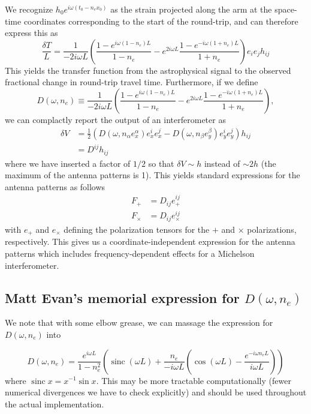 \documentclass{article}
\DeclareMathOperator{\sinc}{sinc}
\begin{document}
We recognize $h_0 e^{i\omega(t_0-n_ex_0)}$ as the strain projected along the arm at the space-time coordinates corresponding to the start of the round-trip, and can therefore express this as
\begin{equation}
    \frac{\delta T}{L} = \frac{1}{-2i\omega L} \left(\frac{1-e^{i\omega(1-n_e)L}}{1-n_e} - e^{2i\omega L}\frac{1-e^{-i\omega(1+n_e)L}}{1+n_e} \right) e_i e_j h_{ij}
\end{equation}
This yields the transfer function from the astrophysical signal to the observed fractional change in round-trip travel time. 
Furthermore, if we define
\begin{equation}
    D(\omega, n_e) \equiv \frac{1}{-2i\omega L} \left(\frac{1-e^{i\omega(1-n_e)L}}{1-n_e} - e^{2i\omega L}\frac{1-e^{-i\omega(1+n_e)L}}{1+n_e} \right),
\end{equation}
we can complactly report the output of an interferometer as
\begin{align}
    \delta V & = \frac{1}{2}\left( D(\omega, n_\alpha e_x^\alpha) e_x^i e_x^j - D(\omega, n_\beta e_y^\beta) e_y^i e_y^j \right) h_{ij} \\
             & = D^{ij} h_{ij}
\end{align}
where we have inserted a factor of $1/2$ so that $\delta V\sim h$ instead of $\sim 2h$ (the maximum of the antenna patterns is 1).
This yields standard expressions for the antenna patterns as follows
\begin{align}
    F_+ & = D_{ij} e_+^{ij} \\
    F_\times & = D_{ij} e_\times^{ij}
\end{align}
with $e_+$ and $e_\times$ defining the polarization tensors for the $+$ and $\times$ polarizations, respectively.
This gives us a coordinate-independent expression for the antenna patterns which includes frequency-dependent effects for a Michelson interferometer.

\subsection*{Matt Evan's memorial expression for $D(\omega, n_e)$}

We note that with some elbow grease, we can massage the expression for $D(\omega, n_e)$ into

\begin{equation}
    D(\omega, n_e) = \frac{e^{i\omega L}}{1-n_e^2}\left( \sinc(\omega L) + \frac{n_e}{-i\omega L} \left( \cos(\omega L) - \frac{e^{-i\omega n_e L}}{i\omega L}\right)\right)
\end{equation}
where $\sinc x = x^{-1} \sin x$.
This may be more tractable computationally (fewer numerical divergences we have to check explicitly) and should be used throughout the actual implementation.
\end{document}
